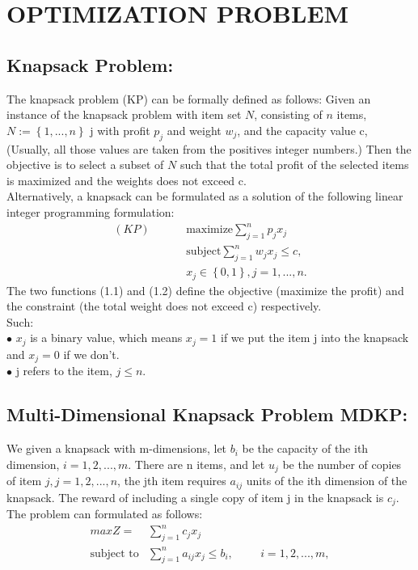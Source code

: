 \chapter{OPTIMIZATION PROBLEM}
\section{Knapsack Problem:}
The knapsack problem (KP) can be formally defined as follows: Given an instance of the knapsack problem with item set $N$, consisting of $n$ items, $N:=\left\{ 1,..., n \right\}$ j with profit $p_{j}$ and weight $w_{j}$, and the capacity value c, (Usually, all those values are taken from the positives integer numbers.) Then the objective is to select a subset of $N$ such that the total profit of the selected items is maximized and the weights does not exceed c.\\
Alternatively, a knapsack can be formulated as a solution of the following linear integer programming formulation:
\begin{subequations}
\renewcommand{\theequation}{\arabic{parentequation}--\arabic{equation}}
\begin{align}
    (KP)\hspace{1cm}&
    \text{maximize}\sum_{j=1}^{n}p_{j}x_{j}\\
    &\text{subject}\sum_{j=1}^{n}w_{j}x_{j}\le c,\\
    &x_{j}\in \left\{ 0, 1 \right\}, j=1,..., n.
\end{align}
\end{subequations}
The two functions (1.1) and (1.2) define the objective (maximize the profit) and the constraint (the total weight does not exceed c) respectively.\\
Such:\\
$\bullet$ $x_{j}$ is a binary value, which means $x_{j}=1$ if we put the item j into the knapsack and $x_{j}=0$ if we don't.\\
$\bullet$ j refers to the item, $j\le n$.
\section{Multi-Dimensional Knapsack Problem MDKP:}
We given a knapsack with m-dimensions, let $b_{i}$ be the capacity of the ith dimension, $i=1, 2, ..., m$. There are n items, and let $u_{j}$ be the number of copies of item $j, j=1, 2, ..., n$, the jth item requires $a_{ij}$ units of the ith dimension of the knapsack. The reward of including a single copy of item j in the knapsack is $c_{j}$. The problem can formulated as follows:
\begin{subequations}
\renewcommand{\theequation}{\arabic{parentequation}--\arabic{equation}}
\begin{align}
    maxZ=&\sum_{j=1}^{n}c_{j}x_{j}\\    \text{subject to}& \sum_{j=1}^{n}a_{ij}x_{j}\le b_{i},\hspace{1cm}i=1, 2,..., m,
\end{align}
\end{subequations}
\newpage
